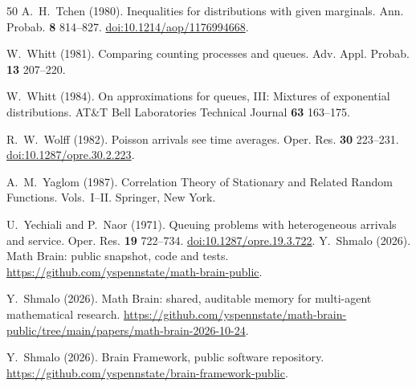 \documentclass[aap,preprint]{imsart}
\numberwithin{equation}{section}
\theoremstyle{plain}
\theoremstyle{definition}
\newcommand{\1}{\mathbf 1}
\begin{document}
\begin{thebibliography}{50}
A.~H.~Tchen (1980).
Inequalities for distributions with given marginals.
Ann. Probab. \textbf{8} 814--827.
\href{https://doi.org/10.1214/aop/1176994668}{doi:10.1214/aop/1176994668}.

W.~Whitt (1981).
Comparing counting processes and queues.
Adv. Appl. Probab. \textbf{13} 207--220.

W.~Whitt (1984).
On approximations for queues, III: Mixtures of exponential distributions.
AT\&T Bell Laboratories Technical Journal \textbf{63} 163--175.

R.~W.~Wolff (1982).
Poisson arrivals see time averages.
Oper. Res. \textbf{30} 223--231.
\href{https://doi.org/10.1287/opre.30.2.223}{doi:10.1287/opre.30.2.223}.

A.~M.~Yaglom (1987).
Correlation Theory of Stationary and Related Random Functions. Vols.~I--II.
Springer, New York.

U.~Yechiali and P.~Naor (1971).
Queuing problems with heterogeneous arrivals and service.
Oper. Res. \textbf{19} 722--734.
\href{https://doi.org/10.1287/opre.19.3.722}{doi:10.1287/opre.19.3.722}.
Y.~Shmalo (2026).
Math Brain: public snapshot, code and tests.
\url{https://github.com/yspennstate/math-brain-public}.

Y.~Shmalo (2026).
Math Brain: shared, auditable memory for multi-agent mathematical research.
\url{https://github.com/yspennstate/math-brain-public/tree/main/papers/math-brain-2026-10-24}.

Y.~Shmalo (2026).
Brain Framework, public software repository.
\url{https://github.com/yspennstate/brain-framework-public}.
\end{thebibliography}
\end{document}

